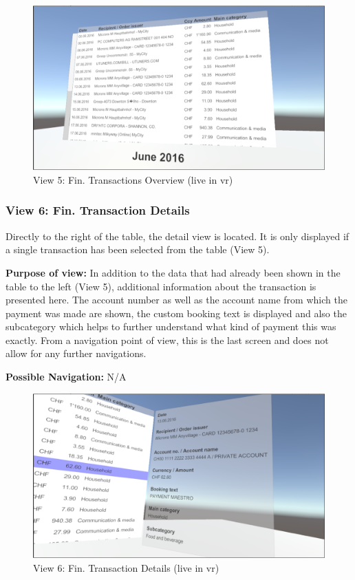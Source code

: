 \begin{figure}[h]
	\begin{center}
		\includegraphics[width=12cm]{03_Figures/08_Development/View5_FinTransactionsOverview.png}
		\caption{View 5: Fin. Transactions Overview (live in \gls{vr})}
		\label{fig:unityview5}
	\end{center}
\end{figure}


\subsubsection{View 6: Fin. Transaction Details}

Directly to the right of the table, the detail view is located. It is only displayed if a single transaction has been selected from the table (View 5).

\textbf{Purpose of view:} In addition to the data that had already been shown in the table to the left (View 5), additional information about the transaction is presented here. The account number as well as the account name from which the payment was made are shown, the custom booking text is displayed and also the subcategory which helps to further understand what kind of payment this was exactly. From a navigation point of view, this is the last screen and does not allow for any further navigations.

\textbf{Possible Navigation:} N/A

\begin{figure}[h]
	\begin{center}
		\includegraphics[width=12cm]{03_Figures/08_Development/View6_FinTransactionDetails.png}
		\caption{View 6: Fin. Transaction Details (live in \gls{vr})}
		\label{fig:unityview6}
	\end{center}
\end{figure}


